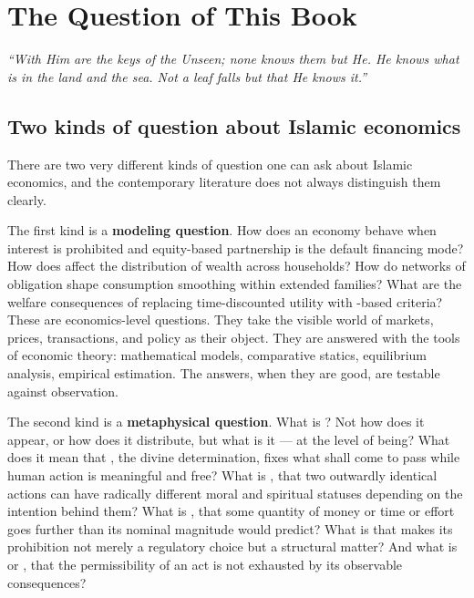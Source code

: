 \chapter{The Question of This Book}
\label{ch:question}

\epigraph{\itshape ``With Him are the keys of the Unseen; none knows them
but He. He knows what is in the land and the sea. Not a leaf falls but
that He knows it.''}{}

\section{Two kinds of question about Islamic economics}
\label{sec:two-kinds-of-question}

There are two very different kinds of question one can ask about Islamic
economics, and the contemporary literature does not always distinguish
them clearly.

The first kind is a \textbf{modeling question}. How does an economy
behave when interest is prohibited and equity-based partnership is the
default financing mode? How does  affect the distribution of
wealth across households? How do networks of  obligation
shape consumption smoothing within extended families? What are the
welfare consequences of replacing time-discounted utility with
-based criteria? These are economics-level questions. They
take the visible world of markets, prices, transactions, and policy as
their object. They are answered with the tools of economic theory:
mathematical models, comparative statics, equilibrium analysis,
empirical estimation. The answers, when they are good, are testable
against observation.

The second kind is a \textbf{metaphysical question}. What is
? Not how does it appear, or how does it distribute, but what
is it --- at the level of being? What does it mean that
, the divine determination, fixes what shall come to pass
while human action is meaningful and free? What is , that
two outwardly identical actions can have radically different moral and
spiritual statuses depending on the intention behind them? What is
, that some quantity of money or time or effort goes
further than its nominal magnitude would predict? What is 
that makes its prohibition not merely a regulatory choice but a
structural matter? And what is  or , that the
permissibility of an act is not exhausted by its observable
consequences?

